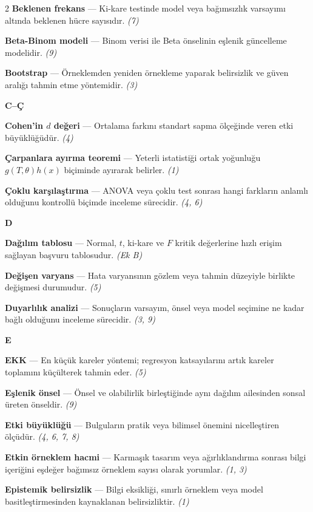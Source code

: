 \begin{multicols}{2}
\textbf{Beklenen frekans} --- Ki-kare testinde model veya bağımsızlık varsayımı altında beklenen hücre sayısıdır. \emph{(7)}\par
\textbf{Beta-Binom modeli} --- Binom verisi ile Beta önselinin eşlenik güncelleme modelidir. \emph{(9)}\par
\textbf{Bootstrap} --- Örneklemden yeniden örnekleme yaparak belirsizlik ve güven aralığı tahmin etme yöntemidir. \emph{(3)}\par
\medskip
\noindent\textbf{\large C--Ç}\par\smallskip
\textbf{Cohen'in $d$ değeri} --- Ortalama farkını standart sapma ölçeğinde veren etki büyüklüğüdür. \emph{(4)}\par
\textbf{Çarpanlara ayırma teoremi} --- Yeterli istatistiği ortak yoğunluğu $g(T,\theta)h(x)$ biçiminde ayırarak belirler. \emph{(1)}\par
\textbf{Çoklu karşılaştırma} --- ANOVA veya çoklu test sonrası hangi farkların anlamlı olduğunu kontrollü biçimde inceleme sürecidir. \emph{(4, 6)}\par
\medskip
\noindent\textbf{\large D}\par\smallskip
\textbf{Dağılım tablosu} --- Normal, $t$, ki-kare ve $F$ kritik değerlerine hızlı erişim sağlayan başvuru tablosudur. \emph{(Ek B)}\par
\textbf{Değişen varyans} --- Hata varyansının gözlem veya tahmin düzeyiyle birlikte değişmesi durumudur. \emph{(5)}\par
\textbf{Duyarlılık analizi} --- Sonuçların varsayım, önsel veya model seçimine ne kadar bağlı olduğunu inceleme sürecidir. \emph{(3, 9)}\par
\medskip
\noindent\textbf{\large E}\par\smallskip
\textbf{EKK} --- En küçük kareler yöntemi; regresyon katsayılarını artık kareler toplamını küçülterek tahmin eder. \emph{(5)}\par
\textbf{Eşlenik önsel} --- Önsel ve olabilirlik birleştiğinde aynı dağılım ailesinden sonsal üreten önseldir. \emph{(9)}\par
\textbf{Etki büyüklüğü} --- Bulguların pratik veya bilimsel önemini nicelleştiren ölçüdür. \emph{(4, 6, 7, 8)}\par
\textbf{Etkin örneklem hacmi} --- Karmaşık tasarım veya ağırlıklandırma sonrası bilgi içeriğini eşdeğer bağımsız örneklem sayısı olarak yorumlar. \emph{(1, 3)}\par
\textbf{Epistemik belirsizlik} --- Bilgi eksikliği, sınırlı örneklem veya model basitleştirmesinden kaynaklanan belirsizliktir. \emph{(1)}\par

\end{multicols}

